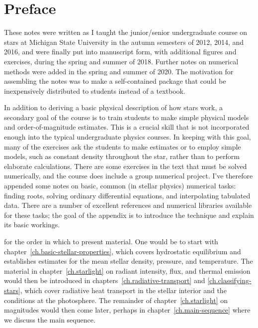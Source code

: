 
\section*{Preface}
These notes were written as I taught the junior/senior undergraduate course on stars at Michigan State University in the autumn semesters of 2012, 2014, and 2016, and were finally put into manuscript form, with additional figures and exercises, during the spring and summer of 2018. Further notes on numerical methods were added in the spring and summer of 2020. The motivation for assembling the notes was to make a self-contained package that could be inexpensively distributed to students instead of a textbook.

In addition to deriving a basic physical description of how stars work, a secondary goal of the course is to train students to make simple physical models and order-of-magnitude estimates. This is a crucial skill that is not incorporated enough into the typical undergraduate physics courses. In keeping with this goal, many of the exercises ask the students to make estimates or to employ simple models, such as constant density throughout the star, rather than to perform elaborate calculations. There are some exercises in the text that must be solved numerically, and the course does include a group numerical project. I've therefore appended some notes on basic, common (in stellar physics) numerical tasks: finding roots, solving ordinary differential equations, and interpolating tabulated data. There are a number of excellent references and numerical libraries available for these tasks; the goal of the appendix is to introduce the technique and explain its basic workings.

 for the order in which to present material. One would be to start with chapter~\ref{ch.basic-stellar-properties}, which covers hydrostatic equilibrium and establishes estimates for the mean stellar density, pressure, and temperature. The material in chapter~\ref{ch.starlight} on radiant intensity, flux, and thermal emission would then be introduced in chapters~\ref{ch.radiative-transport} and \ref{ch.classifying-stars}, which cover radiative heat transport in the stellar interior and the conditions at the photosphere. The remainder of chapter~\ref{ch.starlight} on magnitudes would then come later, perhaps in chapter~\ref{ch.main-sequence} where we discuss the main sequence.


